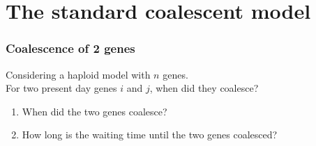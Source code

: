 \documentclass{beamer}
\begin{document}
\begin{frame}
            
        
        \end{frame}

    \section{The standard coalescent model}
        \begin{frame}
            \frametitle{Coalescence of 2 genes}
            Considering a haploid model with $n$ genes. \\
            For two present day genes $i$ and $j$, when did they coalesce? \\
            \begin{enumerate}
                \item<3-> When did the two genes coalesce? \\
                \item<5-> How long is the waiting time until the two genes coalesced? \\
            \end{enumerate}
        \end{frame}
\end{document}
